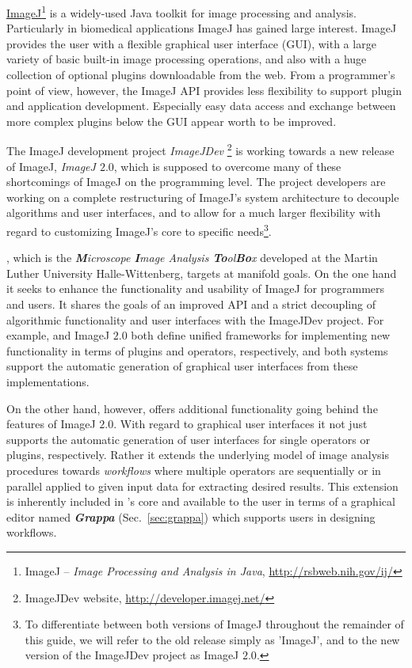 \vspace*{-1cm}
\href{http://rsbweb.nih.gov/ij/}{ImageJ}\footnote{%
ImageJ -- {\em Image Processing and Analysis in Java},
\href{http://rsbweb.nih.gov/ij/}{http://rsbweb.nih.gov/ij/}}
is a widely-used Java toolkit for image processing and analysis. Particularly
in biomedical applications ImageJ has gained large
interest. ImageJ provides the user with a flexible graphical user
interface (GUI), with a large variety of basic built-in image processing operations,
and also with a huge collection of optional plugins downloadable from the
web. From a programmer's point of view, however, the ImageJ API provides less flexibility
to support plugin and application development. Especially easy data access
and exchange between more complex plugins below the GUI appear worth to be improved.

The ImageJ development project {\em ImageJDev }\footnote{ImageJDev website, 
\href{http://developer.imagej.net/}{http://developer.imagej.net/}}
is working towards a new release of ImageJ, {\em ImageJ $2.0$}, 
which is supposed to overcome many of these shortcomings of ImageJ on the programming level. 
The project developers are working on a complete restructuring of ImageJ's system architecture to 
decouple algorithms and user interfaces, and to allow for a much larger flexibility with regard to 
customizing ImageJ's core to specific needs\footnote{To differentiate between both versions of ImageJ throughout the remainder
of this guide, we will refer to the old release simply as 'ImageJ', and to the new version of the ImageJDev project as ImageJ $2.0$.}. 

\mitobo, which is the {\em {\bf \em M}icroscope {\bf \em I}mage Analysis {\bf \em To}ol{\bf \em Bo}x} 
developed at the Martin Luther University Halle-Wittenberg, targets at manifold goals. 
On the one hand it seeks to enhance the functionality and usability of ImageJ for programmers and users.
It shares the goals of an improved API and a strict decoupling of algorithmic 
functionality and user interfaces with the ImageJDev project. For example, \mitobo and ImageJ $2.0$ 
both define unified frameworks for implementing new functionality in terms of plugins and operators,
respectively, and both systems support the automatic generation of graphical user interfaces from 
these implementations.

On the other hand, however, \mitobo 
offers additional functionality going behind the features of ImageJ $2.0$.
With regard to graphical user interfaces it not just supports the automatic generation of user 
interfaces for single operators or plugins, respectively. 
Rather it extends the underlying model of image analysis procedures towards {\em workflows} 
where multiple operators are sequentially or in parallel applied to given input data for 
extracting desired results. 
This extension is inherently included in \mitobo's core and available to the user in 
terms of a graphical editor named {\bf \em Grappa} (Sec.~\ref{sec:grappa}) which supports users in designing workflows.
  
